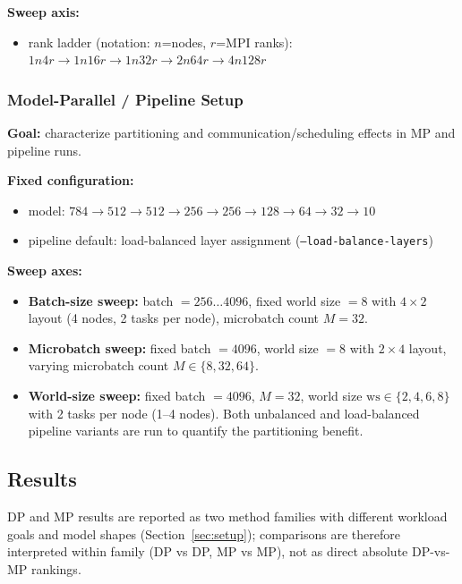 \documentclass[11pt]{article}
\begin{document}
\textbf{Sweep axis:}
\begin{itemize}[nosep]
  \item rank ladder (notation: \(n\)=nodes, \(r\)=MPI ranks):
        \(1n4r \rightarrow 1n16r \rightarrow 1n32r \rightarrow 2n64r \rightarrow 4n128r\)
\end{itemize}


\subsubsection{Model-Parallel / Pipeline Setup}
\textbf{Goal:} characterize partitioning and communication/scheduling effects
in MP and pipeline runs.

\textbf{Fixed configuration:}
\begin{itemize}[nosep]
  \item model: \(784\!\rightarrow\!512\!\rightarrow\!512\!\rightarrow\!256\!\rightarrow\!256\!\rightarrow\!128\!\rightarrow\!64\!\rightarrow\!32\!\rightarrow\!10\)
  \item pipeline default: load-balanced layer assignment (\texttt{--load-balance-layers})
\end{itemize}

\textbf{Sweep axes:}
\begin{itemize}[nosep]
  \item \textbf{Batch-size sweep:} batch \(=256 \ldots 4096\), fixed world
        size \(=8\) with \(4\!\times\!2\) layout (4 nodes, 2 tasks per node),
        microbatch count \(M=32\).
  \item \textbf{Microbatch sweep:} fixed batch \(=4096\), world size \(=8\)
        with \(2\!\times\!4\) layout, varying microbatch count
        \(M \in \{8, 32, 64\}\).
  \item \textbf{World-size sweep:} fixed batch \(=4096\), \(M=32\), world
        size \(\mathrm{ws}\in\{2,4,6,8\}\) with 2 tasks per node
        (1--4 nodes). Both unbalanced and load-balanced pipeline variants
        are run to quantify the partitioning benefit.
\end{itemize}
\FloatBarrier
\subsection{Results}
\label{sec:results}
DP and MP results are reported as two method families with different workload
goals and model shapes (Section~\ref{sec:setup}); comparisons are therefore
interpreted within family (DP vs DP, MP vs MP), not as direct absolute DP-vs-MP
rankings.
\end{document}

